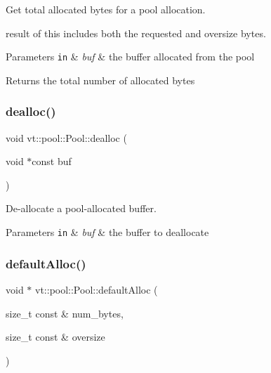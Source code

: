 Get total allocated bytes for a pool allocation. 

result of this includes both the requested and oversize bytes.


\begin{DoxyParams}[1]{Parameters}
\mbox{\tt in}  & {\em buf} & the buffer allocated from the pool\\
\hline
\end{DoxyParams}
\begin{DoxyReturn}{Returns}
the total number of allocated bytes 
\end{DoxyReturn}
\mbox{\label{structvt_1_1pool_1_1_pool_a73ef123aa04b44ae875716e2c7b95cab}} 
\subsubsection{\texorpdfstring{dealloc()}{dealloc()}}
{\footnotesize\ttfamily void vt\+::pool\+::\+Pool\+::dealloc (\begin{DoxyParamCaption}\item[{void $\ast$const}]{buf }\end{DoxyParamCaption})}



De-\/allocate a pool-\/allocated buffer. 


\begin{DoxyParams}[1]{Parameters}
\mbox{\tt in}  & {\em buf} & the buffer to deallocate \\
\hline
\end{DoxyParams}
\mbox{\label{structvt_1_1pool_1_1_pool_ad9eb4c0efa76dc46487e23e265554943}} 
\subsubsection{\texorpdfstring{default\+Alloc()}{defaultAlloc()}}
{\footnotesize\ttfamily void $\ast$ vt\+::pool\+::\+Pool\+::default\+Alloc (\begin{DoxyParamCaption}\item[{size\+\_\+t const \&}]{num\+\_\+bytes,  }\item[{size\+\_\+t const \&}]{oversize }\end{DoxyParamCaption})\hspace{0.3cm}{\ttfamily [private]}}



